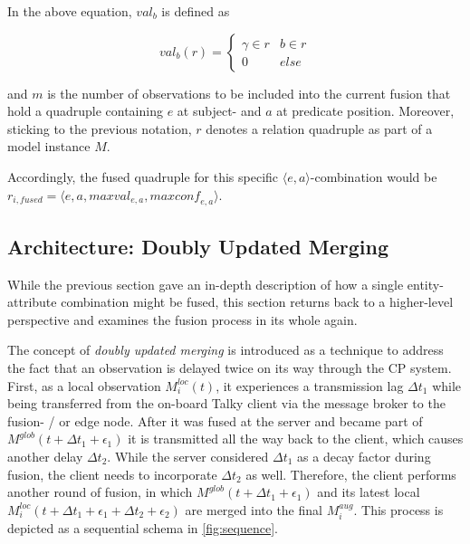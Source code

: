 In the above equation, $\textit{val}_b$ is defined as

$$
\textit{val}_b(r) = 
	\begin{cases}
	\gamma \in r & b \in r \\
	0 & else
	\end{cases}
$$

and $m$ is the number of observations to be included into the current fusion that hold a quadruple containing $e$ at subject- and $a$ at predicate position. Moreover, sticking to the previous notation, $r$ denotes a relation quadruple as part of a model instance $M$.

Accordingly, the fused quadruple for this specific $\langle e, a \rangle$-combination would be $r_{i,fused} = \langle e, a, \textit{maxval}_{e,a}, \textit{maxconf}_{e,a} \rangle$.

\subsection{Architecture: Doubly Updated Merging}
\label{subsec:concept_design:fusion_architecture}

While the previous section gave an in-depth description of how a single entity-attribute combination might be fused, this section returns back to a higher-level perspective and examines the fusion process in its whole again.

The concept of \textit{doubly updated merging} is introduced as a technique to address the fact that an observation is delayed twice on its way through the CP system. First, as a local observation $M^{loc}_i(t)$, it experiences a transmission lag $\Delta t_1$ while being transferred from the on-board Talky client via the message broker to the fusion- / or edge node. After it was fused at the server and became part of $M^{glob}(t+\Delta t_1+\epsilon_1)$ it is transmitted all the way back to the client, which causes another delay $\Delta t_2$. While the server considered $\Delta t_1$ as a decay factor during fusion, the client needs to incorporate $\Delta t_2$ as well. Therefore, the client performs another round of fusion, in which $M^{glob}(t+\Delta t_1+\epsilon_1)$ and its latest local $M^{loc}_i(t+\Delta t_1+\epsilon_1+\Delta t_2+\epsilon_2)$ are merged into the final $M^{aug}_i$. This process is depicted as a sequential schema in \autoref{fig:sequence}.

